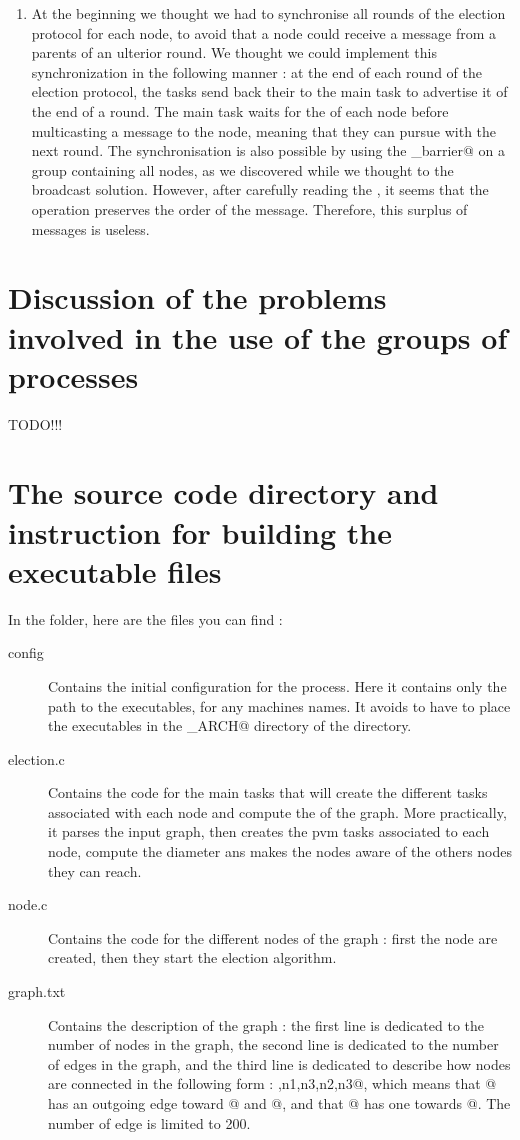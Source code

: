 \documentclass{article}
\begin{document}
\begin{enumerate}
\item At the beginning we thought we had to synchronise all rounds of the election protocol for each node, to avoid that a node could receive a message from a parents of an ulterior round. We thought we could implement this synchronization in the following manner : at the end of each round of the election protocol, the \verb@pvm@ tasks send back their \verb@tid@ to the main task to advertise it of the end of a round. The main task waits for the \verb@tid@ of each node before multicasting a \verb@go@ message to the node, meaning that they can pursue with the next round. The synchronisation is also possible by using the \verb@pvm_barrier@ on a group containing all nodes, as we discovered while we thought to the broadcast solution. However, after carefully reading the \verb@manpage@, it seems that the \verb@recv@ operation preserves the order of the message. Therefore, this surplus of messages is useless.
\end{enumerate}

\section{Discussion of the problems involved in the use of the groups of processes}
 \huge{TODO!!!}
 
 \normalsize
\section{The source code directory and instruction for building the executable files}
In the \verb@code@ folder, here are the files you can find : 
\begin{description}
\item[config] Contains the initial configuration for the \verb@pvm@ process. Here it contains only the path to the executables, for any machines names. It avoids to have to place the executables in the \verb@PVM_ARCH@ directory of the \verb@pvm@ directory.
\item[election.c] Contains the code for the main tasks that will create the different \verb@pvm@ tasks associated with each node and compute the \verb@diameter@ of the graph. More practically, it parses the input graph, then creates the pvm tasks associated to each node, compute the diameter ans makes the nodes aware of the others nodes they can reach.
\item[node.c] Contains the code for the different nodes of the graph : first the node are created, then they start the election algorithm.
\item[graph.txt] Contains the description of the graph : the first line is dedicated to the number of nodes in the graph, the second line is dedicated to the number of edges in the graph, and the third line is dedicated to describe how nodes are connected in the following form : ,{n1,n3},{n2,n3}@, which means that @ has an outgoing edge toward @ and @, and that @ has one towards @. The number of edge is limited to 200.
\end{description}
\end{document}
